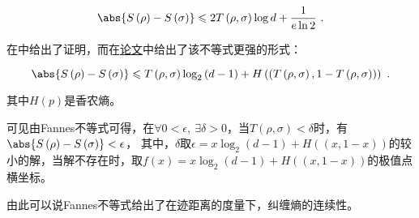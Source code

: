 \begin{equation}
\abs{S\left(\rho\right) - S\left(\sigma\right)} \leqslant 2 T\left(\rho,\sigma\right)\log d + \frac{1}{e\ln 2}~.
\end{equation}

在\cite{量子信息}中给出了证明，而在\href{https://arxiv.org/pdf/quant-ph/0610146.pdf}{论文}中给出了该不等式更强的形式：

\begin{equation}
\abs{S\left(\rho\right) - S\left(\sigma\right)} \leqslant T\left(\rho,\sigma\right)\log_2\left(d-1\right) + H\left(\left(T\left(\rho,\sigma\right),1-T\left(\rho,\sigma\right)\right)\right)~.
\end{equation}

其中$H(p)$是香农熵。

可见由Fannes不等式可得，在$\forall 0<\epsilon,~\exists \delta>0$，当$T\left(\rho,\sigma\right)<\delta$时，有$\abs{S\left(\rho\right) - S\left(\sigma\right)}<\epsilon$，
其中，$\delta$取$\epsilon = x\log_2\left(d-1\right) + H\left(\left(x,1-x\right)\right)$的较小的解，当解不存在时，取$f(x)=x\log_2\left(d-1\right) + H\left(\left(x,1-x\right)\right)$的极值点横坐标。

由此可以说Fannes不等式给出了在迹距离的度量下，纠缠熵的连续性。